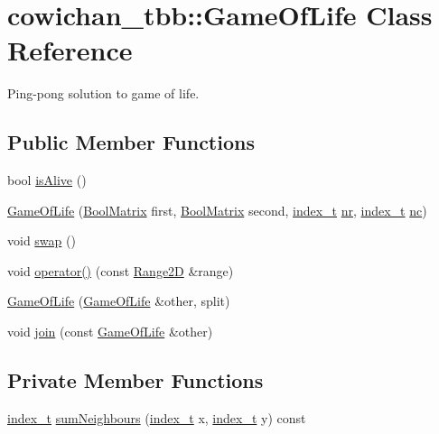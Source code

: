 \hypertarget{classcowichan__tbb_1_1_game_of_life}{
\section{cowichan\_\-tbb::GameOfLife Class Reference}
\label{classcowichan__tbb_1_1_game_of_life}
}
Ping-pong solution to game of life.  


\subsection*{Public Member Functions}
\begin{CompactItemize}
\item 
bool \hyperlink{classcowichan__tbb_1_1_game_of_life_38dced5f2712fe6c42c1299084461f0d}{isAlive} ()
\item 
\hyperlink{classcowichan__tbb_1_1_game_of_life_4793e3b09cc0c43cdb3d5bff8c002a3f}{GameOfLife} (\hyperlink{cowichan_8hpp_a64c8df2f1e9c8ea68a7bcc19aca683e}{BoolMatrix} first, \hyperlink{cowichan_8hpp_a64c8df2f1e9c8ea68a7bcc19aca683e}{BoolMatrix} second, \hyperlink{cowichan_8hpp_5b04577d5d21124855deaad298595371}{index\_\-t} \hyperlink{classcowichan__tbb_1_1_game_of_life_570da56c471fa8c5f2c83e572775f75e}{nr}, \hyperlink{cowichan_8hpp_5b04577d5d21124855deaad298595371}{index\_\-t} \hyperlink{classcowichan__tbb_1_1_game_of_life_e7584561d427c5f4922853deda9b402f}{nc})
\item 
void \hyperlink{classcowichan__tbb_1_1_game_of_life_36367ee9491f53e457b6c3f728046f3b}{swap} ()
\item 
void \hyperlink{classcowichan__tbb_1_1_game_of_life_f6bab39a7e2ab18a6a5834b914d0cc9c}{operator()} (const \hyperlink{cowichan__tbb_8hpp_e591b8e6980ddc5982ee22655da2ab8e}{Range2D} \&range)
\item 
\hyperlink{classcowichan__tbb_1_1_game_of_life_074fbeb388fc5d5f5a33d25e0bfe1845}{GameOfLife} (\hyperlink{classcowichan__tbb_1_1_game_of_life}{GameOfLife} \&other, split)
\item 
void \hyperlink{classcowichan__tbb_1_1_game_of_life_c69b9fbc57f35d86238020436b2eb5bb}{join} (const \hyperlink{classcowichan__tbb_1_1_game_of_life}{GameOfLife} \&other)
\end{CompactItemize}
\subsection*{Private Member Functions}
\begin{CompactItemize}
\item 
\hyperlink{cowichan_8hpp_5b04577d5d21124855deaad298595371}{index\_\-t} \hyperlink{classcowichan__tbb_1_1_game_of_life_cfdc8525672ceaf09c57f0e302320de7}{sumNeighbours} (\hyperlink{cowichan_8hpp_5b04577d5d21124855deaad298595371}{index\_\-t} x, \hyperlink{cowichan_8hpp_5b04577d5d21124855deaad298595371}{index\_\-t} y) const 
\end{CompactItemize}
